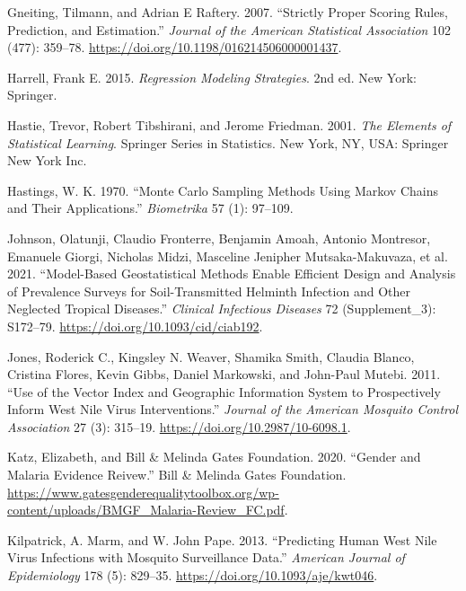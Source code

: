 \documentclass[
  letterpaper,
]{krantz}
\newlength{\cslhangindent}
\newenvironment{CSLReferences}[2] %
 {\begin{list}{}{%
  \setlength{\itemindent}{0pt}
  \setlength{\leftmargin}{0pt}
  \setlength{\parsep}{0pt}
  \ifodd #1
   \setlength{\leftmargin}{\cslhangindent}
   \setlength{\itemindent}{-1\cslhangindent}
  \fi
  \setlength{\itemsep}{#2\baselineskip}}}
 {\end{list}}
\begin{document}
\begin{CSLReferences}{1}{0}
Gneiting, Tilmann, and Adrian E Raftery. 2007. {``Strictly Proper
Scoring Rules, Prediction, and Estimation.''} \emph{Journal of the
American Statistical Association} 102 (477): 359--78.
\url{https://doi.org/10.1198/016214506000001437}.

Harrell, Frank E. 2015. \emph{Regression Modeling Strategies}. 2nd ed.
New York: Springer.

Hastie, Trevor, Robert Tibshirani, and Jerome Friedman. 2001. \emph{The
Elements of Statistical Learning}. Springer Series in Statistics. New
York, NY, USA: Springer New York Inc.

Hastings, W. K. 1970. {``Monte Carlo Sampling Methods Using Markov
Chains and Their Applications.''} \emph{Biometrika} 57 (1): 97--109.

Johnson, Olatunji, Claudio Fronterre, Benjamin Amoah, Antonio Montresor,
Emanuele Giorgi, Nicholas Midzi, Masceline Jenipher Mutsaka-Makuvaza, et
al. 2021. {``Model-Based Geostatistical Methods Enable Efficient Design
and Analysis of Prevalence Surveys for Soil-Transmitted Helminth
Infection and Other Neglected Tropical Diseases.''} \emph{Clinical
Infectious Diseases} 72 (Supplement\_3): S172--79.
\url{https://doi.org/10.1093/cid/ciab192}.

Jones, Roderick C., Kingsley N. Weaver, Shamika Smith, Claudia Blanco,
Cristina Flores, Kevin Gibbs, Daniel Markowski, and John-Paul Mutebi.
2011. {``Use of the Vector Index and Geographic Information System to
Prospectively Inform West Nile Virus Interventions.''} \emph{Journal of
the American Mosquito Control Association} 27 (3): 315--19.
\url{https://doi.org/10.2987/10-6098.1}.

Katz, Elizabeth, and Bill \& Melinda Gates Foundation. 2020. {``Gender
and Malaria Evidence Reivew.''} Bill \& Melinda Gates Foundation.
\url{https://www.gatesgenderequalitytoolbox.org/wp-content/uploads/BMGF_Malaria-Review_FC.pdf}.

Kilpatrick, A. Marm, and W. John Pape. 2013. {``Predicting Human West
Nile Virus Infections with Mosquito Surveillance Data.''} \emph{American
Journal of Epidemiology} 178 (5): 829--35.
\url{https://doi.org/10.1093/aje/kwt046}.


\end{CSLReferences}
\end{document}
